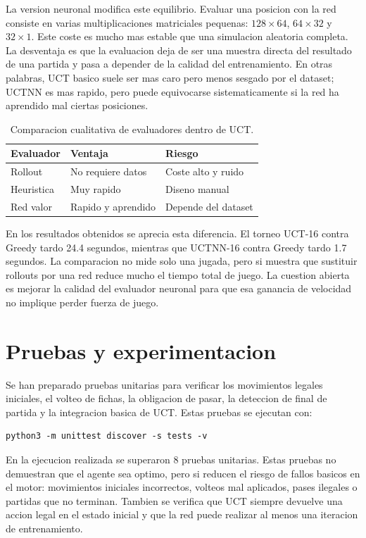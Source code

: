 \documentclass[conference,a4paper]{IEEEtran}
\begin{document}
La version neuronal modifica este equilibrio. Evaluar una posicion con la red
consiste en varias multiplicaciones matriciales pequenas: \(128 \times 64\),
\(64 \times 32\) y \(32 \times 1\). Este coste es mucho mas estable que una
simulacion aleatoria completa. La desventaja es que la evaluacion deja de ser
una muestra directa del resultado de una partida y pasa a depender de la calidad
del entrenamiento. En otras palabras, UCT basico suele ser mas caro pero menos
sesgado por el dataset; UCTNN es mas rapido, pero puede equivocarse
sistematicamente si la red ha aprendido mal ciertas posiciones.

\begin{table}[h]
\centering
\caption{Comparacion cualitativa de evaluadores dentro de UCT.}
\label{tab:evaluadores}
\begin{tabular}{lll}
\toprule
Evaluador & Ventaja & Riesgo \\
\midrule
Rollout & No requiere datos & Coste alto y ruido \\
Heuristica & Muy rapido & Diseno manual \\
Red valor & Rapido y aprendido & Depende del dataset \\
\bottomrule
\end{tabular}
\end{table}

En los resultados obtenidos se aprecia esta diferencia. El torneo UCT-16 contra
Greedy tardo 24.4 segundos, mientras que UCTNN-16 contra Greedy tardo 1.7
segundos. La comparacion no mide solo una jugada, pero si muestra que sustituir
rollouts por una red reduce mucho el tiempo total de juego. La cuestion abierta
es mejorar la calidad del evaluador neuronal para que esa ganancia de velocidad
no implique perder fuerza de juego.

\section{Pruebas y experimentacion}

Se han preparado pruebas unitarias para verificar los movimientos legales
iniciales, el volteo de fichas, la obligacion de pasar, la deteccion de final de
partida y la integracion basica de UCT. Estas pruebas se ejecutan con:

\begin{verbatim}
python3 -m unittest discover -s tests -v
\end{verbatim}

En la ejecucion realizada se superaron 8 pruebas unitarias. Estas pruebas no
demuestran que el agente sea optimo, pero si reducen el riesgo de fallos
basicos en el motor: movimientos iniciales incorrectos, volteos mal aplicados,
pases ilegales o partidas que no terminan. Tambien se verifica que UCT siempre
devuelve una accion legal en el estado inicial y que la red puede realizar al
menos una iteracion de entrenamiento.
\end{document}
